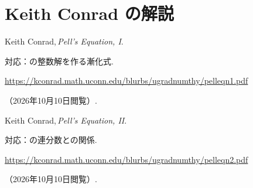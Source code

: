   \section{Keith Conrad の解説}
  \begin{enumerate}[resume,label={[\arabic*]}]
    \item \begin{minipage}[t]{\linewidth}\raggedright
        Keith Conrad,\,\textit{Pell's Equation, I}.
        \par{\small 対応：の整数解を作る漸化式.\par}
        \par\noindent\url{https://kconrad.math.uconn.edu/blurbs/ugradnumthy/pelleqn1.pdf}\par
        \noindent（2026年10月10日閲覧）.
      \end{minipage}\par\smallskip

    \item \begin{minipage}[t]{\linewidth}\raggedright
        Keith Conrad,\,\textit{Pell's Equation, II}.
        \par{\small 対応：の連分数との関係.\par}
        \par\noindent\url{https://kconrad.math.uconn.edu/blurbs/ugradnumthy/pelleqn2.pdf}\par
        \noindent（2026年10月10日閲覧）.
      \end{minipage}\par\smallskip

  \end{enumerate}
\endgroup
